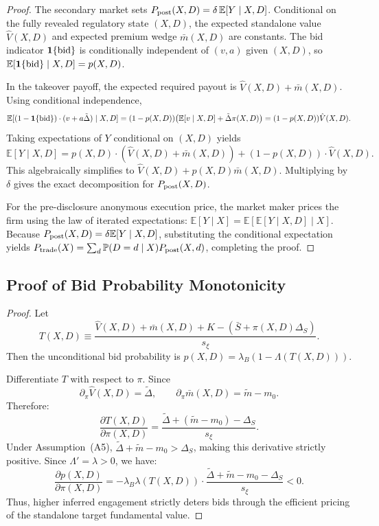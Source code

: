 \documentclass[11pt]{article}
\newcommand{\E}{\mathbb{E}}
\newcommand{\PP}{\mathbb{P}}
\newcommand{\1}{\mathbf{1}}
\begin{document}
\begin{proof}
    The secondary market sets $P_{\textup{post}}(X,D)=\delta\,\E[Y \mid X,D]$. Conditional on the fully revealed regulatory state $(X,D)$, the expected standalone value $\hat{V}(X,D)$ and expected premium wedge $\bar{m}(X,D)$ are constants. The bid indicator $\1\{\textup{bid}\}$ is conditionally independent of $(v,a)$ given $(X,D)$, so $\E[\1\{\textup{bid}\} \mid X,D]=p(X,D)$.

  In the takeover payoff, the expected required payout is $\hat{V}(X,D) + \bar{m}(X,D)$. Using conditional independence,
\[
\E[(1-\1\{\textup{bid}\})\cdot (v + a\tilde{\Delta}) \mid X,D] = (1-p(X,D))\big(\E[v \mid X,D]+\tilde{\Delta}\pi(X,D)\big) = (1-p(X,D))\hat{V}(X,D).
\]
  Taking expectations of $Y$ conditional on $(X,D)$ yields
  \[
  \E[Y \mid X,D]
  =p(X,D)\cdot(\hat{V}(X,D)+\bar{m}(X,D))+(1-p(X,D))\cdot\hat{V}(X,D).
  \]
  This algebraically simplifies to $\hat{V}(X,D) + p(X,D)\bar{m}(X,D)$. Multiplying by $\delta$ gives the exact decomposition for $P_{\textup{post}}(X,D)$.

  For the pre-disclosure anonymous execution price, the market maker prices the firm using the law of iterated expectations: $\E[Y \mid X] = \E[\E[Y \mid X, D] \mid X]$. Because $P_{\textup{post}}(X,D) = \delta \E[Y \mid X,D]$, substituting the conditional expectation yields $P_{\textup{trade}}(X) = \sum_d \PP(D=d \mid X) P_{\textup{post}}(X,d)$, completing the proof.
\end{proof}

\subsection{Proof of Bid Probability Monotonicity}
\label{app:proof-bid-monotone}

\begin{proof}
Let
\[
T(X,D)\equiv \frac{\hat{V}(X,D)+\bar{m}(X,D)+K-(\bar{S}+\pi(X,D)\Delta_S)}{s_\xi}.
\]
Then the unconditional bid probability is $p(X,D)=\lambda_B(1-\Lambda(T(X,D)))$.

Differentiate $T$ with respect to $\pi$. Since
\[
\partial_\pi \hat{V}(X,D)=\tilde{\Delta},
\qquad
\partial_\pi \bar{m}(X,D)=\tilde{m}-m_0.
\]
Therefore:
\[
\frac{\partial T(X,D)}{\partial \pi(X,D)} = \frac{\tilde{\Delta} + (\tilde{m}-m_0) - \Delta_S}{s_\xi}.
\]
Under Assumption~\textup{(A5)}, $\tilde{\Delta} + \tilde{m}-m_0 > \Delta_S$, making this derivative strictly positive.
Since $\Lambda' = \lambda > 0$, we have:
\[
\frac{\partial p(X,D)}{\partial \pi(X,D)}=-\lambda_B \lambda(T(X,D)) \cdot \frac{\tilde{\Delta} + \tilde{m}-m_0 - \Delta_S}{s_\xi} < 0.
\]
Thus, higher inferred engagement strictly deters bids through the efficient pricing of the standalone target fundamental value.
\end{proof}
\end{document}
